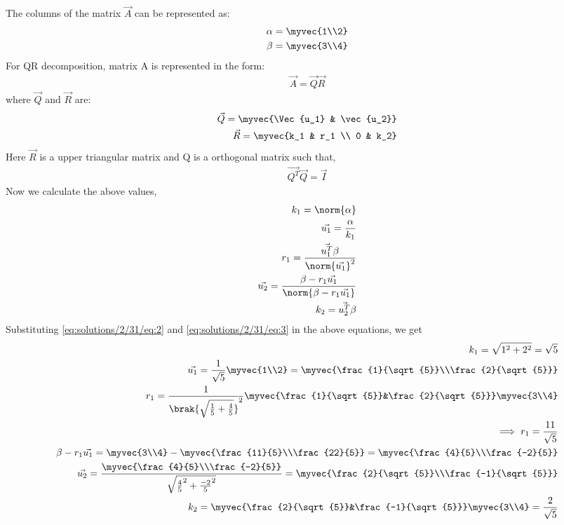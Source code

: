 The columns of the matrix $\vec{A}$ can be represented as:
\begin{align}
\alpha=\myvec{1\\2}\label{eq:solutions/2/31/eq:2}\\
\beta=\myvec{3\\4}\label{eq:solutions/2/31/eq:3}
\end{align}
For QR decomposition, matrix A is represented in the form:
\begin{align}
    \Vec{A}=\vec{Q}\vec{R}
\end{align}
where $\vec{Q}$ and $\Vec{R}$ are:
\begin{align}
    \vec{Q}=\myvec{\Vec{u_1} & \vec{u_2}}\label{eq:solutions/2/31/eq:4}\\
    \vec{R}=\myvec{k_1 & r_1 \\ 0 & k_2}\label{eq:solutions/2/31/eq:5}
\end{align}
Here $\vec{R}$ is a upper triangular matrix and Q is a orthogonal matrix such that,
\begin{align}
\vec{Q^T}\vec{Q}=\vec{I}
\end{align}
Now we calculate the above values,
\begin{align}
k_1 = \norm{\alpha}\\
\vec{u_1}=\frac{\alpha}{k_1}\\
r_1 = \frac{\vec{u_1^T}\beta}{\norm{\Vec{u_1}}^2}\\
\vec{u_2}=\frac{\beta-r_1\vec{u_1}}{\norm{\beta-r_1\vec{u_1}}}\\
k_2 = \vec{u_2^T}\beta
\end{align}
Substituting \eqref{eq:solutions/2/31/eq:2} and \eqref{eq:solutions/2/31/eq:3} in the above equations, we get
\begin{align}
k_1= \sqrt{1^2+2^2}= \sqrt{5}\\
\vec{u_1}= \frac{1}{\sqrt{5}}\myvec{1\\2}=\myvec{\frac{1}{\sqrt{5}}\\\frac{2}{\sqrt{5}}}\\
r_1=\frac{1}{\brak{\sqrt{\frac{1}{5}+\frac{4}{5}}}^2}\myvec{\frac{1}{\sqrt{5}}&\frac{2}{\sqrt{5}}}\myvec{3\\4}\\
\implies r_1= \frac{11}{\sqrt{5}}\\
\beta-r_1\vec{u_1}=\myvec{3\\4}-\myvec{\frac{11}{5}\\\frac{22}{5}}=\myvec{\frac{4}{5}\\\frac{-2}{5}}\\
\Vec{u_2}=\frac{\myvec{\frac{4}{5}\\\frac{-2}{5}}}{\sqrt{{\frac{4}{5}}^2+{\frac{-2}{5}}^2}}=\myvec{\frac{2}{\sqrt{5}}\\\frac{-1}{\sqrt{5}}}\\
k_2 = \myvec{\frac{2}{\sqrt{5}}&\frac{-1}{\sqrt{5}}}\myvec{3\\4}= \frac{2}{\sqrt{5}}
\end{align}

